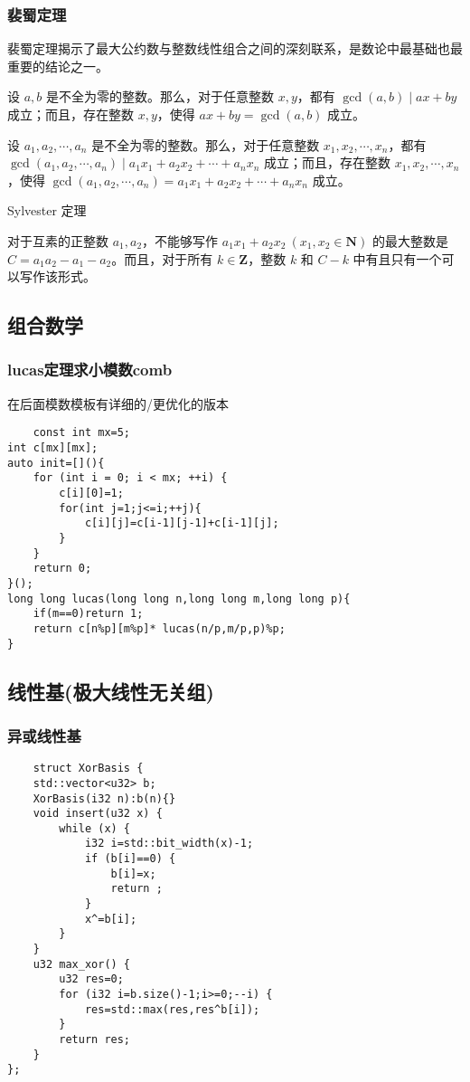 \documentclass[UTF8]{ctexart}
\begin{document}
\subsubsection{裴蜀定理}
裴蜀定理揭示了最大公约数与整数线性组合之间的深刻联系，是数论中最基础也最重要的结论之一。

设 $a,b$ 是不全为零的整数。那么，对于任意整数 $x,y$，都有 $\gcd(a,b)\mid ax+by$ 成立；而且，存在整数 $x,y$，使得 $ax+by=\gcd(a,b)$ 成立。

设 $a_1,a_2,\cdots,a_n$ 是不全为零的整数。那么，对于任意整数 $x_1,x_2,\cdots,x_n$，都有 $\gcd(a_1,a_2,\cdots,a_n)\mid a_1x_1+a_2x_2+\cdots+a_nx_n$ 成立；而且，存在整数 $x_1,x_2,\cdots,x_n$，使得 $\gcd(a_1,a_2,\cdots,a_n)=a_1x_1+a_2x_2+\cdots+a_nx_n$ 成立。

Sylvester 定理

对于互素的正整数 $a_1,a_2$，不能够写作 $a_1x_1+a_2x_2~(x_1,x_2\in\mathbf N)$ 的最大整数是 $C = a_1a_2 - a_1 - a_2$。而且，对于所有 $k\in\mathbf Z$，整数 $k$ 和 $C-k$ 中有且只有一个可以写作该形式。
\subsection{组合数学}
\subsubsection{lucas定理求小模数comb}
在后面模数模板有详细的/更优化的版本
\begin{lstlisting}
    const int mx=5;
int c[mx][mx];
auto init=[](){
    for (int i = 0; i < mx; ++i) {
        c[i][0]=1;
        for(int j=1;j<=i;++j){
            c[i][j]=c[i-1][j-1]+c[i-1][j];
        }
    }
    return 0;
}();
long long lucas(long long n,long long m,long long p){
    if(m==0)return 1;
    return c[n%p][m%p]* lucas(n/p,m/p,p)%p;
}
\end{lstlisting}
\subsection{线性基(极大线性无关组)}
\subsubsection{异或线性基}
\begin{lstlisting}
    struct XorBasis {
    std::vector<u32> b;
    XorBasis(i32 n):b(n){}
    void insert(u32 x) {
        while (x) {
            i32 i=std::bit_width(x)-1;
            if (b[i]==0) {
                b[i]=x;
                return ;
            }
            x^=b[i];
        }
    }
    u32 max_xor() {
        u32 res=0;
        for (i32 i=b.size()-1;i>=0;--i) {
            res=std::max(res,res^b[i]);
        }
        return res;
    }
};
\end{lstlisting}
\end{document}
